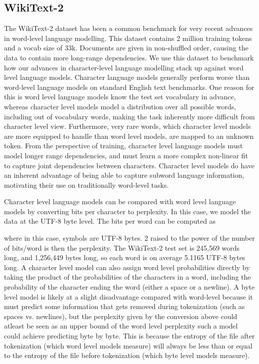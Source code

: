 \documentclass{article}
\begin{document}
\subsection{WikiText-2}
The WikiText-2 dataset has been a common benchmark for very recent advances in word-level language modelling. This dataset contains 2 million training tokens and a vocab size of 33k. Documents are given in non-shuffled order, causing the data to contain more long-range dependencies. We use this dataset to benchmark how our advances in character-level language modelling stack up against word level language models. Character language models generally perform worse than word-level language models on standard English text benchmarks. One reason for this is word level language models know the test set vocabulary in advance, whereas character level models model a distribution over all possible words, including out of vocabulary words, making the task inherently more difficult from character level view. Furthermore, very rare words, which character level models are more equipped to handle than word level models, are mapped to an unknown token. From the perspective of training, character level language models must model longer range dependencies, and must learn a more complex non-linear fit to capture joint dependencies between characters. Character level models do have an inherent advantage of being able to capture subword language information, motivating their use on traditionally word-level tasks.


Character level language models can be compared with word level language models by converting bits per character to perplexity. In this case, we model the data at the UTF-8 byte level. The bits per word can be computed as

where in this case, symbols are UTF-8 bytes. 2 raised to the power of the number of bits/word is then the perplexity. The WikiText-2 test set is 245,569 words long, and 1,256,449 bytes long, so each word is on average 5.1165 UTF-8 bytes long. A character level model can also assign word level probabilities directly by taking the product of the probabilities of the characters in a word, including the probability of the character ending the word (either a space or a newline). A byte level model is likely at a slight disadvantage compared with word-level because it must predict some information that gets removed during tokenization (such as spaces vs. newlines), but the perplexity given by the conversion above could atleast be seen as an upper bound of the word level perplexity such a model could achieve predicting byte by byte. This is because the entropy of the file after tokenization (which word level models measure) will always be less than or equal to the entropy of the file before tokenization (which byte level models measure).
\end{document}

